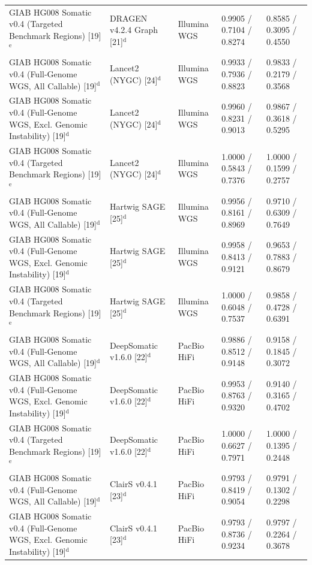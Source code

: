 \begin{table}[htbp]
{\begin{tabular}{lllll}
GIAB HG008 Somatic v0.4 (Targeted Benchmark Regions) [19]$^{\text{e}}$ & DRAGEN v4.2.4 Graph [21]$^{\text{d}}$ & Illumina WGS & 0.9905 / 0.7104 / 0.8274 & 0.8585 / 0.3095 / 0.4550 \\
GIAB HG008 Somatic v0.4 (Full-Genome WGS, All Callable) [19]$^{\text{d}}$ & Lancet2 (NYGC) [24]$^{\text{d}}$ & Illumina WGS & 0.9933 / 0.7936 / 0.8823 & 0.9833 / 0.2179 / 0.3568 \\
GIAB HG008 Somatic v0.4 (Full-Genome WGS, Excl. Genomic Instability) [19]$^{\text{d}}$ & Lancet2 (NYGC) [24]$^{\text{d}}$ & Illumina WGS & 0.9960 / 0.8231 / 0.9013 & 0.9867 / 0.3618 / 0.5295 \\
GIAB HG008 Somatic v0.4 (Targeted Benchmark Regions) [19]$^{\text{e}}$ & Lancet2 (NYGC) [24]$^{\text{d}}$ & Illumina WGS & 1.0000 / 0.5843 / 0.7376 & 1.0000 / 0.1599 / 0.2757 \\
GIAB HG008 Somatic v0.4 (Full-Genome WGS, All Callable) [19]$^{\text{d}}$ & Hartwig SAGE [25]$^{\text{d}}$ & Illumina WGS & 0.9956 / 0.8161 / 0.8969 & 0.9710 / 0.6309 / 0.7649 \\
GIAB HG008 Somatic v0.4 (Full-Genome WGS, Excl. Genomic Instability) [19]$^{\text{d}}$ & Hartwig SAGE [25]$^{\text{d}}$ & Illumina WGS & 0.9958 / 0.8413 / 0.9121 & 0.9653 / 0.7883 / 0.8679 \\
GIAB HG008 Somatic v0.4 (Targeted Benchmark Regions) [19]$^{\text{e}}$ & Hartwig SAGE [25]$^{\text{d}}$ & Illumina WGS & 1.0000 / 0.6048 / 0.7537 & 0.9858 / 0.4728 / 0.6391 \\
GIAB HG008 Somatic v0.4 (Full-Genome WGS, All Callable) [19]$^{\text{d}}$ & DeepSomatic v1.6.0 [22]$^{\text{d}}$ & PacBio HiFi & 0.9886 / 0.8512 / 0.9148 & 0.9158 / 0.1845 / 0.3072 \\
GIAB HG008 Somatic v0.4 (Full-Genome WGS, Excl. Genomic Instability) [19]$^{\text{d}}$ & DeepSomatic v1.6.0 [22]$^{\text{d}}$ & PacBio HiFi & 0.9953 / 0.8763 / 0.9320 & 0.9140 / 0.3165 / 0.4702 \\
GIAB HG008 Somatic v0.4 (Targeted Benchmark Regions) [19]$^{\text{e}}$ & DeepSomatic v1.6.0 [22]$^{\text{d}}$ & PacBio HiFi & 1.0000 / 0.6627 / 0.7971 & 1.0000 / 0.1395 / 0.2448 \\
GIAB HG008 Somatic v0.4 (Full-Genome WGS, All Callable) [19]$^{\text{d}}$ & ClairS v0.4.1 [23]$^{\text{d}}$ & PacBio HiFi & 0.9793 / 0.8419 / 0.9054 & 0.9791 / 0.1302 / 0.2298 \\
GIAB HG008 Somatic v0.4 (Full-Genome WGS, Excl. Genomic Instability) [19]$^{\text{d}}$ & ClairS v0.4.1 [23]$^{\text{d}}$ & PacBio HiFi & 0.9793 / 0.8736 / 0.9234 & 0.9797 / 0.2264 / 0.3678 \\

\end{tabular}}
\end{table}
